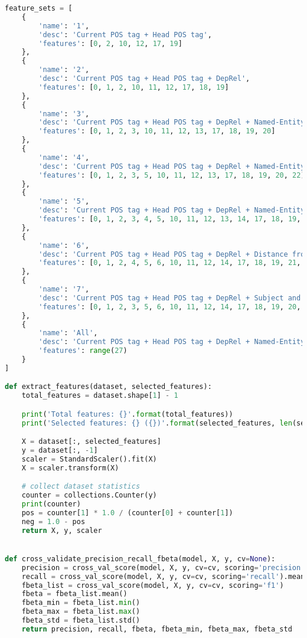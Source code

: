 \begin{lstlisting}[language=Python]
feature_sets = [
    {
        'name': '1',
        'desc': 'Current POS tag + Head POS tag',
        'features': [0, 2, 10, 12, 17, 19]
    },
    {
        'name': '2',
        'desc': 'Current POS tag + Head POS tag + DepRel',
        'features': [0, 1, 2, 10, 11, 12, 17, 18, 19]
    },
    {
        'name': '3',
        'desc': 'Current POS tag + Head POS tag + DepRel + Named-Entity',
        'features': [0, 1, 2, 3, 10, 11, 12, 13, 17, 18, 19, 20]
    },
    {
        'name': '4',
        'desc': 'Current POS tag + Head POS tag + DepRel + Named-Entity + Distance from Predicate',
        'features': [0, 1, 2, 3, 5, 10, 11, 12, 13, 17, 18, 19, 20, 22]
    },
    {
        'name': '5',
        'desc': 'Current POS tag + Head POS tag + DepRel + Named-Entity + Distance from Predicate + Dependents Count',
        'features': [0, 1, 2, 3, 4, 5, 10, 11, 12, 13, 14, 17, 18, 19, 20, 21, 22]
    },
    {
        'name': '6',
        'desc': 'Current POS tag + Head POS tag + DepRel + Distance from Predicate + Dependents Count + Dependency with Predicate',
        'features': [0, 1, 2, 4, 5, 6, 10, 11, 12, 14, 17, 18, 19, 21, 22, 23]
    },
    {
        'name': '7',
        'desc': 'Current POS tag + Head POS tag + DepRel + Subject and Object Named-Entities + Distance from Predicate + Dependents Count Predicate and Object + Dependency with Predicate',
        'features': [0, 1, 2, 3, 5, 6, 10, 11, 12, 14, 17, 18, 19, 20, 21, 22, 23]
    },
    {
        'name': 'All',
        'desc': 'Current POS tag + Head POS tag + DepRel + Named-Entity + Distance from Predicate + Dependents Count + Neighbouring POS tags + Dependency with Predicate',
        'features': range(27)
    }
]

def extract_features(dataset, selected_features):
    total_features = dataset.shape[1] - 1

    print('Total features: {}'.format(total_features))
    print('Selected features: {} ({})'.format(selected_features, len(selected_features)))

    X = dataset[:, selected_features]
    y = dataset[:, -1]
    scaler = StandardScaler().fit(X)
    X = scaler.transform(X)

    # collect dataset statistics
    counter = collections.Counter(y)
    print(counter)
    pos = counter[1] * 1.0 / (counter[0] + counter[1])
    neg = 1.0 - pos
    return X, y, scaler


def cross_validate_precision_recall_fbeta(model, X, y, cv=None):
    precision = cross_val_score(model, X, y, cv=cv, scoring='precision').mean()
    recall = cross_val_score(model, X, y, cv=cv, scoring='recall').mean()
    fbeta_list = cross_val_score(model, X, y, cv=cv, scoring='f1')
    fbeta = fbeta_list.mean()
    fbeta_min = fbeta_list.min()
    fbeta_max = fbeta_list.max()
    fbeta_std = fbeta_list.std()
    return precision, recall, fbeta, fbeta_min, fbeta_max, fbeta_std



\end{lstlisting}
